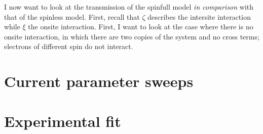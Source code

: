 I now want to look at the transmission of the spinfull model \emph{in comparison} with that of the spinless model. First, recall that $\zeta$ describes the intersite interaction while $\xi$ the onsite interaction. First, I want to look at the case where there is no onsite interaction, in which there are two copies of the system and no cross terms; electrons of different spin do not interact.


\section{Current parameter sweeps}
\label{sec:twositeparamsweep}
\section{Experimental fit}
\label{sec:perrin}
